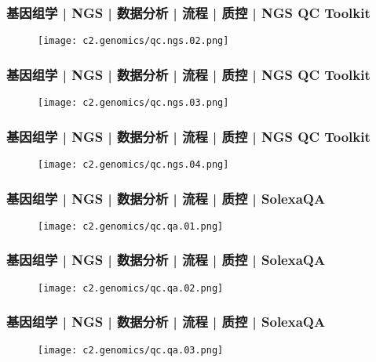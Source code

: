 \begin{frame}
  \frametitle{基因组学 | NGS | 数据分析 | 流程 | 质控 | NGS QC Toolkit}
  \begin{figure}
    \centering
    \texttt{[image: c2.genomics/qc.ngs.02.png]}
  \end{figure}
\end{frame}

\begin{frame}
  \frametitle{基因组学 | NGS | 数据分析 | 流程 | 质控 | NGS QC Toolkit}
  \begin{figure}
    \centering
    \texttt{[image: c2.genomics/qc.ngs.03.png]}
  \end{figure}
\end{frame}

\begin{frame}
  \frametitle{基因组学 | NGS | 数据分析 | 流程 | 质控 | NGS QC Toolkit}
  \begin{figure}
    \centering
    \texttt{[image: c2.genomics/qc.ngs.04.png]}
  \end{figure}
\end{frame}

\begin{frame}
  \frametitle{基因组学 | NGS | 数据分析 | 流程 | 质控 | SolexaQA}
  \begin{figure}
    \centering
    \texttt{[image: c2.genomics/qc.qa.01.png]}
  \end{figure}
\end{frame}

\begin{frame}
  \frametitle{基因组学 | NGS | 数据分析 | 流程 | 质控 | SolexaQA}
  \begin{figure}
    \centering
    \texttt{[image: c2.genomics/qc.qa.02.png]}
  \end{figure}
\end{frame}

\begin{frame}
  \frametitle{基因组学 | NGS | 数据分析 | 流程 | 质控 | SolexaQA}
  \begin{figure}
    \centering
    \texttt{[image: c2.genomics/qc.qa.03.png]}
  \end{figure}
\end{frame}

